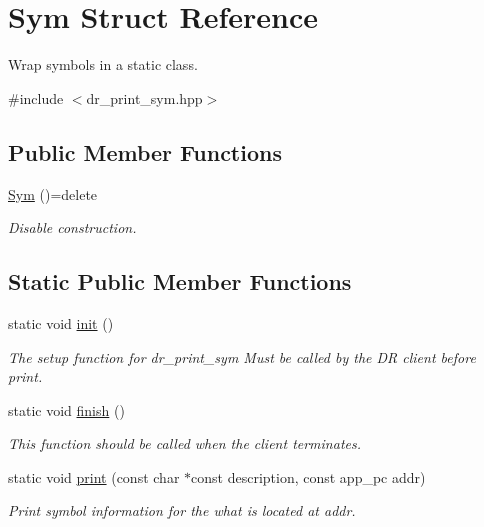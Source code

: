 \hypertarget{struct_sym}{}\section{Sym Struct Reference}
\label{struct_sym}


Wrap symbols in a static class.  




{\ttfamily \#include $<$dr\+\_\+print\+\_\+sym.\+hpp$>$}

\subsection*{Public Member Functions}
\begin{DoxyCompactItemize}
\item 
\hyperlink{struct_sym_aa2c1e0336fc028030e91c380230a0ae3}{Sym} ()=delete
\begin{DoxyCompactList}\small\item\em Disable construction. \end{DoxyCompactList}\end{DoxyCompactItemize}
\subsection*{Static Public Member Functions}
\begin{DoxyCompactItemize}
\item 
static void \hyperlink{struct_sym_aa14d1ce9dbef3383d591499714c4d164}{init} ()
\begin{DoxyCompactList}\small\item\em The setup function for dr\+\_\+print\+\_\+sym Must be called {\itshape by the DR client} before print. \end{DoxyCompactList}\item 
static void \hyperlink{struct_sym_a474eb27bfe01436357e0be478020611c}{finish} ()
\begin{DoxyCompactList}\small\item\em This function should be called when the client terminates. \end{DoxyCompactList}\item 
static void \hyperlink{struct_sym_abe62e638eae7f459e420c7361e41fe71}{print} (const char $\ast$const description, const app\+\_\+pc addr)
\begin{DoxyCompactList}\small\item\em Print symbol information for the what is located at addr. \end{DoxyCompactList}\end{DoxyCompactItemize}

